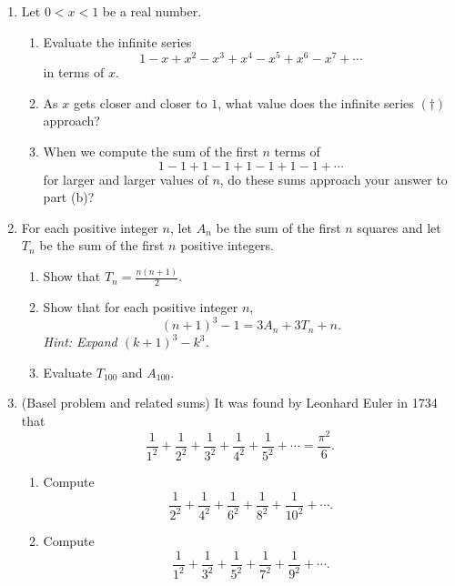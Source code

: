 \begin{enumerate}[resume]
\item Let $0 < x < 1$ be a real number.
\begin{enumerate}
\item Evaluate the infinite series
\begin{equation*}
1 - x + x^2 - x^3 + x^4 - x^5 + x^6 - x^7 + \cdots \tag{$\dagger$}
\end{equation*}
in terms of $x$.
\item As $x$ gets closer and closer to $1$, what value does the infinite series $(\dagger)$ approach?
\item When we compute the sum of the first $n$ terms of
\begin{equation*}
1 - 1 + 1 - 1 + 1 - 1 + 1 - 1 + \cdots
\end{equation*}
for larger and larger values of $n$, do these sums approach your answer to part (b)?
\end{enumerate}
\item For each positive integer $n$, let $A_n$ be the sum of the first $n$ squares and let $T_n$ be the sum of the first $n$ positive integers.
\begin{enumerate}
\item Show that $T_n = \frac{n(n + 1)}{2}$.
\item Show that for each positive integer $n$,
\begin{equation*}
(n + 1)^3 - 1 = 3A_n + 3T_n + n.
\end{equation*}
\emph{Hint: Expand $(k + 1)^3 - k^3$.}
\item Evaluate $T_{100}$ and $A_{100}$.
\end{enumerate}
\item (Basel problem and related sums) It was found by Leonhard Euler in 1734 that
\begin{equation*}
\frac{1}{1^2} + \frac{1}{2^2} + \frac{1}{3^2} + \frac{1}{4^2} + \frac{1}{5^2} + \cdots = \frac{\pi^2}{6}.
\end{equation*}
\begin{enumerate}
\item Compute
\begin{equation*}
\frac{1}{2^2} + \frac{1}{4^2} + \frac{1}{6^2} + \frac{1}{8^2} + \frac{1}{10^2} + \cdots.
\end{equation*}
\item Compute
\begin{equation*}
\frac{1}{1^2} + \frac{1}{3^2} + \frac{1}{5^2} + \frac{1}{7^2} + \frac{1}{9^2} + \cdots.
\end{equation*}
\end{enumerate}
\end{enumerate}


